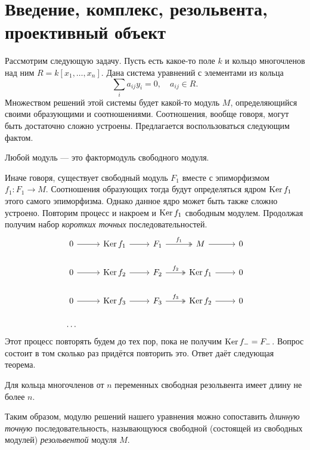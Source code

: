 \documentclass[../main.tex]{subfiles}
\begin{document}
\section{Введение, комплекс, резольвента, проективный объект}
Рассмотрим следующую задачу. Пусть есть какое-то поле $k$ и кольцо многочленов над ним $R=k[x_1, \ldots, x_n]$. Дана система уравнений с элементами из кольца
\begin{equation*}
    \sum_i a_{ij}y_i = 0, \quad a_{ij}\in R.
\end{equation*}
Множеством решений этой системы будет какой-то модуль $M$, определяющийся своими образующими и соотношениями. Соотношения, вообще говоря, могут быть достаточно сложно устроены. Предлагается воспользоваться следующим фактом.
\begin{to_suj}\label{free_factor}
Любой модуль --- это фактормодуль свободного модуля.
\end{to_suj}
Иначе говоря, существует свободный модуль $F_1$ вместе с эпиморфизмом $f_1:F_1\to M$. Соотношения образующих тогда будут определяться ядром $\mathop{\mathrm{Ker}}\nolimits f_1$ этого самого эпиморфизма. Однако данное ядро может быть также сложно устроено. Повторим процесс и накроем и $\mathop{\mathrm{Ker}}\nolimits f_1$ свободным модулем. Продолжая получим набор \emph{коротких точных} последовательностей.
\begin{equation}\label{equation_short_exact}
\begin{tikzcd}
	0 & {\Ker f_1} & {F_1} & M & 0 \\
	0 & {\Ker f_2} & {F_2} & {\Ker f_1} & 0 \\
	0 & {\Ker f_3} & {F_3} & {\Ker f_2} & 0 \\
	\ldots & {} & {}
	\arrow[from=1-4, to=1-5]
	\arrow["{f_1}", two heads, from=1-3, to=1-4]
	\arrow[from=1-2, to=1-3]
	\arrow[from=2-4, to=2-5]
	\arrow["{f_2}", two heads, from=2-3, to=2-4]
	\arrow[from=2-2, to=2-3]
	\arrow[from=3-4, to=3-5]
	\arrow["{f_3}", two heads, from=3-3, to=3-4]
	\arrow[from=3-2, to=3-3]
	\arrow[from=3-1, to=3-2]
	\arrow[from=2-1, to=2-2]
	\arrow[from=1-1, to=1-2]
\end{tikzcd}
\end{equation}
Этот процесс повторять будем до тех пор, пока не получим $\mathop{\mathrm{Ker}}\nolimits f_- = F_-$. Вопрос состоит в том сколько раз придётся повторить это. Ответ даёт следующая теорема.
\begin{to_thr}
Для кольца многочленов от $n$ переменных свободная резольвента имеет длину не более $n$. 
\end{to_thr}
Таким образом, модулю решений нашего уравнения можно сопоставить \emph{длинную точную} последовательность, называющуюся свободной (состоящей из свободных модулей) \emph{резольвентой} модуля $M$.
\end{document}
